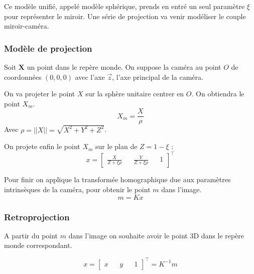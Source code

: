 Ce modèle unifié, appelé modèle sphérique, prends en entré un seul paramètre $\xi$ pour représenter le miroir.
Une série de projection va venir modéliser le couple miroir-caméra.


\subsubsection{Modèle de projection}

Soit $\mathbf{X}$ un point dans le repère monde.
On suppose la caméra au point $O$ de coordonnées $(0,0,0)$ avec l'axe $\vec{z}$, l'axe principal de la caméra.

On va projeter le point $X$ sur la sphère unitaire centrer en $O$. On obtiendra le point $X_m$.
\begin{equation}
X_m = \frac{X}{\rho}
\end{equation}
Avec $\rho = ||X|| = \sqrt{X^2+Y^2+Z^2}$.

On projete enfin le point $X_m$ sur le plan de $Z = 1 - \xi$ :
\begin{equation}
x = \begin{bmatrix}  \frac{X}{Z+\xi \rho} && \frac{Y}{Z +\xi \rho} && 1 \end{bmatrix}^{\top}
\end{equation}

Pour finir on applique la transformée homographique due aux paramètres intrinsèques de la caméra, pour obtenir le point $m$ dans l'image.
\begin{equation}
m= K x
\end{equation}

\subsubsection{Retroprojection}

A partir du point $m$ dans l'image on souhaite avoir le point 3D dans le repère monde correspondant.

\begin{equation}
x = \begin{bmatrix} x && y && 1 \end{bmatrix}^{\top} = K^{-1} m
\end{equation}

